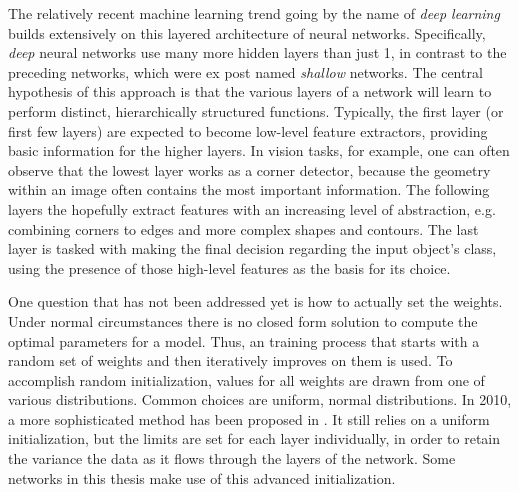 \documentclass[11pt, a4paper]{article}
\begin{document}
The relatively recent machine learning trend going by the name of \emph{deep learning} builds extensively on this layered architecture of neural networks. Specifically, \emph{deep} neural networks use many more hidden layers than just 1, in contrast to the preceding networks, which were ex post named \emph{shallow} networks. The central hypothesis of this approach is that the various layers of a network will learn to perform distinct, hierarchically structured functions. Typically, the first layer (or first few layers) are expected to become low-level feature extractors, providing basic information for the higher layers. In vision tasks, for example, one can often observe that the lowest layer works as a corner detector, because the geometry within an image often contains the most important information. The following layers the hopefully extract features with an increasing level of abstraction, e.g. combining corners to edges and more complex shapes and contours. The last layer is tasked with making the final decision regarding the input object's class, using the presence of those high-level features as the basis for its choice.

One question that has not been addressed yet is how to actually set the weights. Under normal circumstances there is no closed form solution to compute the optimal parameters for a model. Thus, an training process that starts with a random set of weights and then iteratively improves on them is used. To accomplish random initialization, values for all weights are drawn from one of various distributions. Common choices are uniform, normal distributions. In 2010, a more sophisticated method has been proposed in \cite{glorot-understanding-deep-nn-training}. It still relies on a uniform initialization, but the limits are set for each layer individually, in order to retain the variance the data as it flows through the layers of the network. Some networks in this thesis make use of this advanced initialization.
\end{document}
